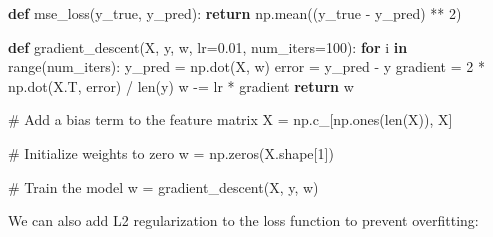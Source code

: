 \documentclass[
  9pt,
  letterpaper,
  abstract,
  titlepage]{scrbook}
\newenvironment{Shaded}{\begin{snugshade}}{\end{snugshade}}
\newcommand{\BuiltInTok}[1]{\textcolor[rgb]{0.00,0.23,0.31}{#1}}
\newcommand{\CommentTok}[1]{\textcolor[rgb]{0.37,0.37,0.37}{#1}}
\newcommand{\ControlFlowTok}[1]{\textcolor[rgb]{0.00,0.23,0.31}{\textbf{#1}}}
\newcommand{\DecValTok}[1]{\textcolor[rgb]{0.68,0.00,0.00}{#1}}
\newcommand{\FloatTok}[1]{\textcolor[rgb]{0.68,0.00,0.00}{#1}}
\newcommand{\KeywordTok}[1]{\textcolor[rgb]{0.00,0.23,0.31}{\textbf{#1}}}
\newcommand{\NormalTok}[1]{\textcolor[rgb]{0.00,0.23,0.31}{#1}}
\newcommand{\OperatorTok}[1]{\textcolor[rgb]{0.37,0.37,0.37}{#1}}
\begin{document}
\begin{Shaded}
\begin{Highlighting}[]
\KeywordTok{def}\NormalTok{ mse\_loss(y\_true, y\_pred):}
    \ControlFlowTok{return}\NormalTok{ np.mean((y\_true }\OperatorTok{{-}}\NormalTok{ y\_pred) }\OperatorTok{**} \DecValTok{2}\NormalTok{)}

\KeywordTok{def}\NormalTok{ gradient\_descent(X, y, w, lr}\OperatorTok{=}\FloatTok{0.01}\NormalTok{, num\_iters}\OperatorTok{=}\DecValTok{100}\NormalTok{):}
    \ControlFlowTok{for}\NormalTok{ i }\KeywordTok{in} \BuiltInTok{range}\NormalTok{(num\_iters):}
\NormalTok{        y\_pred }\OperatorTok{=}\NormalTok{ np.dot(X, w)}
\NormalTok{        error }\OperatorTok{=}\NormalTok{ y\_pred }\OperatorTok{{-}}\NormalTok{ y}
\NormalTok{        gradient }\OperatorTok{=} \DecValTok{2} \OperatorTok{*}\NormalTok{ np.dot(X.T, error) }\OperatorTok{/} \BuiltInTok{len}\NormalTok{(y)}
\NormalTok{        w }\OperatorTok{{-}=}\NormalTok{ lr }\OperatorTok{*}\NormalTok{ gradient}
    \ControlFlowTok{return}\NormalTok{ w}

\CommentTok{\# Add a bias term to the feature matrix}
\NormalTok{X }\OperatorTok{=}\NormalTok{ np.c\_[np.ones(}\BuiltInTok{len}\NormalTok{(X)), X]  }

\CommentTok{\# Initialize weights to zero}
\NormalTok{w }\OperatorTok{=}\NormalTok{ np.zeros(X.shape[}\DecValTok{1}\NormalTok{])}

\CommentTok{\# Train the model}
\NormalTok{w }\OperatorTok{=}\NormalTok{ gradient\_descent(X, y, w)}
\end{Highlighting}
\end{Shaded}

We can also add L2 regularization to the loss function to prevent
overfitting:
\end{document}

